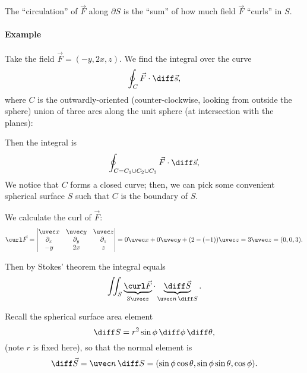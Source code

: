 \documentclass{multi}
\begin{document}
The ``circulation'' of \(\vec F\) along \(\partial S\) is the ``sum'' of how much field \(\vec F\) ``curls'' in \(S\).

\paragraph{Example}

Take the field \(\vec F = (-y, 2x, z)\). We find the integral over the curve 
\[
    \oint_C \vec F \cdot \diff \vec s,
\]
where \(C\) is the outwardly-oriented (counter-clockwise, looking from outside the sphere) union of three arcs along the unit sphere (at intersection with the planes):
\begin{center}
  
\end{center}


Then the integral is
\[
    \oint_{C = C_1 \cup C_2 \cup C_3} \vec F \cdot \diff \vec s,
\]
We notice that \(C\) forms a closed curve; then, we can pick some convenient spherical surface \(S\) such that \(C\) is the boundary of \(S\). 

We calculate the curl of \(\vec F\):
\[
    \curl \vec F = 
    \begin{vmatrix}
        \uvec x & \uvec y & \uvec z \\
        \partial_x & \partial_y & \partial_z \\
        -y & 2x & z
    \end{vmatrix}
    =
    0 \uvec x + 0 \uvec y + (2 - (-1)) \uvec z
    = 3 \uvec z
    = (0, 0, 3).
\]

Then by Stokes' theorem the integral equals
\[
    \iint_S \underbrace{\curl \vec F}_{3 \uvec z} \cdot \underbrace{\diff \vec S}_{\uvec n \, \diff S}.
\]

Recall the spherical surface area element
\[
    \diff S = r^2 \sin \phi \, \diff \phi \, \diff \theta,
\]
(note \(r\) is fixed here), so that the normal element is
\[
    \diff \vec S = \uvec n \, \diff S = (\sin\phi \cos\theta, \sin \phi \sin \theta, \cos \phi).
\]
\end{document}
